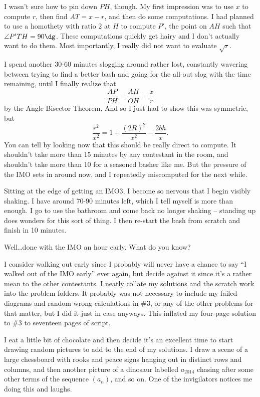 \documentclass[11pt]{scrreprt}
\numberwithin{figure}{chapter}
\begin{document}
I wasn't sure how to pin down $PH$, though. My first impression was to use $x$ to compute $r$, then find $AT = x-r$, and then do some computations. I had planned to use a homothety with ratio $2$ at $H$ to compute $P'$, the point on $AH$ such that $\angle P'TH = 90\dg$.
These computations quickly get hairy and I don't actually want to do them.
Most importantly, I really did not want to evaluate $\sqrt r$.

I spend another 30-60 minutes slogging around rather lost, constantly wavering between trying to find a better bash and going for the all-out slog with the time remaining,  until I finally realize that
\[ \frac{AP}{PH} = \frac{AH}{OH} = \frac{x}{r} \]
by the Angle Bisector Theorem. And so I just had to show this was symmetric, but
\[ \frac{r^2}{x^2} = 1 + \frac{(2R)^2}{x^2} - \frac{2bh}{x}. \]
You can tell by looking now that this should be really direct to compute. It shouldn't take more than 15 minutes by any contestant in the room, and shouldn't take more than 10 for a seasoned basher like me.
But the pressure of the IMO sets in around now, and I repeatedly miscomputed for the next while.

Sitting at the edge of getting an IMO3, I become so nervous that I begin visibly shaking.
I have around 70-90 minutes left, which I tell myself is more than enough.
I go to use the bathroom and come back no longer shaking -- standing up does wonders for this sort of thing.
I then re-start the bash from scratch and finish in 10 minutes.

Well\dots done with the IMO an hour early. What do you know?

I consider walking out early since I probably will never have a chance to say ``I walked out of the IMO early'' ever again, but decide against it since it's a rather mean to the other contestants.
I neatly collate my solutions and the scratch work into the problem folders. It probably was not necessary to include my failed diagrams and random wrong calculations in \#3, or any of the other problems for that matter, but I did it just in case anyways.
This inflated my four-page solution to \#3 to seventeen pages of script.

I eat a little bit of chocolate and then decide it's an excellent time to start drawing random pictures to add to the end of my solutions.
I draw a scene of a large chessboard with rooks and peace signs hanging out in distinct rows and columns, and then another picture of a dinosaur labelled $a_{2014}$ chasing after some other terms of the sequence $(a_n)$, and so on.
One of the invigilators notices me doing this and laughs.
\end{document}
